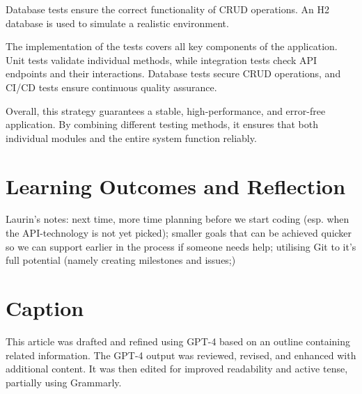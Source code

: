 \documentclass[a4paper, 11pt]{article}
\begin{document}
Database tests ensure the correct functionality of CRUD operations. An H2 database is used to simulate a realistic environment.

The implementation of the tests covers all key components of the application. Unit tests validate individual methods, while integration tests check API endpoints and their interactions. Database tests secure CRUD operations, and CI/CD tests ensure continuous quality assurance.

Overall, this strategy guarantees a stable, high-performance, and error-free application. By combining different testing methods, it ensures that both individual modules and the entire system function reliably.


    \section{Learning Outcomes and Reflection}\label{sec:learning-outcomes-and-reflection}
    Laurin's notes: next time, more time planning before we start coding (esp. when the API-technology is not yet picked); smaller goals that can be achieved quicker so we can support earlier in the process if someone needs help; utilising Git to it's full potential (namely creating milestones and issues;)



    \section*{Caption}
    This article was drafted and refined using GPT-4 based on an outline containing related information. The GPT-4 output was reviewed, revised, and enhanced with additional content. It was then edited for improved readability and active tense, partially using Grammarly.
\end{document}
